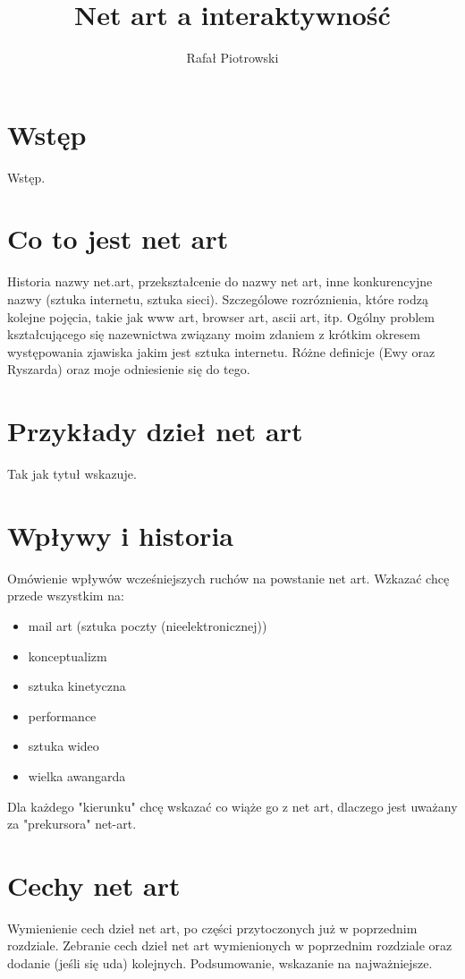 \documentclass[a4paper,12pt]{article}
\author{Rafał Piotrowski}
\title{Net art a interaktywność}
\begin{document}
\maketitle

\tableofcontents

\section{Wstęp}
Wstęp.

\section{Co to jest net art}
Historia nazwy net.art, przekształcenie do nazwy net art,
inne konkurencyjne nazwy (sztuka internetu, sztuka sieci).
Szczególowe rozróznienia, które rodzą kolejne pojęcia,
takie jak www art, browser art, ascii art, itp.
Ogólny problem kształcującego
się nazewnictwa związany moim zdaniem z krótkim okresem występowania
zjawiska jakim jest sztuka internetu. Różne definicje (Ewy oraz Ryszarda)
oraz moje odniesienie się do tego.

\section{Przykłady dzieł net art}
Tak jak tytuł wskazuje.

\section{Wpływy i historia}
Omówienie wpływów wcześniejszych ruchów na powstanie net art.
Wzkazać chcę przede wszystkim na:
\begin{itemize}
\item mail art (sztuka poczty (nieelektronicznej))
\item konceptualizm
\item sztuka kinetyczna
\item performance
\item sztuka wideo
\item wielka awangarda
\end{itemize}
Dla każdego "kierunku" chcę wskazać co wiąże go z net art,
dlaczego jest uważany za "prekursora" net-art.

\section{Cechy net art}
Wymienienie cech dzieł net art, po części przytoczonych już
w poprzednim rozdziale. Zebranie cech dzieł net art wymienionych
w poprzednim rozdziale oraz dodanie (jeśli się uda) kolejnych.
Podsumowanie, wskazanie na najważniejsze. 
\end{document}
